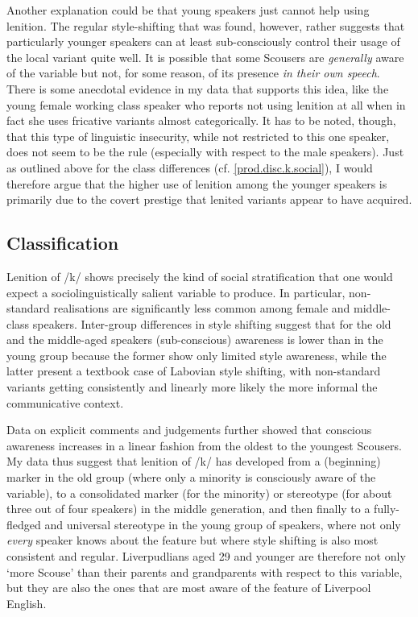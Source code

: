 Another explanation could be that young speakers just cannot help using lenition.
The regular style-shifting that was found, however, rather suggests that particularly younger speakers can at least sub-consciously control their usage of the local variant quite well.
It is possible that some Scousers are \emph{generally} aware of the variable but not, for some reason, of its presence \emph{in their own speech}.
There is some anecdotal evidence in my data that supports this idea, like the young female working class speaker who reports not using lenition at all when in fact she uses fricative variants almost categorically.
It has to be noted, though, that this type of linguistic insecurity, while not restricted to this one speaker, does not seem to be the rule (especially with respect to the male speakers).
Just as outlined above for the class differences (cf. \ref{prod.disc.k.social}), I would therefore argue that the higher use of lenition among the younger speakers is primarily due to the covert prestige that lenited variants appear to have acquired.

\subsection{Classification}
\label{prod.disc.k.classification}

Lenition of /k/ shows precisely the kind of social stratification that one would expect a sociolinguistically salient variable to produce.
In particular, non-standard realisations are significantly less common among female and middle-class speakers.
Inter-group differences in style shifting suggest that for the old and the middle-aged speakers (sub-conscious) awareness is lower than in the young group because the former show only limited style awareness, while the latter present a textbook case of Labovian style shifting, with non-standard variants getting consistently and linearly more likely the more informal the communicative context.

Data on explicit comments and judgements further showed that conscious awareness increases in a linear fashion from the oldest to the youngest Scousers.
My data thus suggest that lenition of /k/ has developed from a (beginning) marker in the old group (where only a minority is consciously aware of the variable), to a consolidated marker (for the minority) or stereotype (for about three out of four speakers) in the middle generation, and then finally to a fully-fledged and universal stereotype in the young group of speakers, where not only \emph{every} speaker knows about the feature but where style shifting is also most consistent and regular.
Liverpudlians aged 29 and younger are therefore not only `more Scouse' than their parents and grandparents with respect to this variable, but they are also the ones that are most aware of the feature of Liverpool English.

